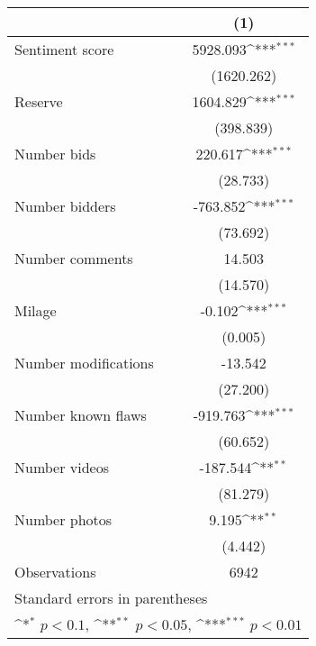 {
\def\sym#1{\ifmmode^{#1}\else\(^{#1}\)\fi}
\begin{tabular}{l*{1}{c}}
\hline\hline
                    &\multicolumn{1}{c}{(1)}         \\
\hline
Sentiment score     &    5928.093\sym{***}\\
                    &  (1620.262)         \\
[1em]
Reserve             &    1604.829\sym{***}\\
                    &   (398.839)         \\
[1em]
Number bids         &     220.617\sym{***}\\
                    &    (28.733)         \\
[1em]
Number bidders      &    -763.852\sym{***}\\
                    &    (73.692)         \\
[1em]
Number comments     &      14.503         \\
                    &    (14.570)         \\
[1em]
Milage              &      -0.102\sym{***}\\
                    &     (0.005)         \\
[1em]
Number modifications&     -13.542         \\
                    &    (27.200)         \\
[1em]
Number known flaws  &    -919.763\sym{***}\\
                    &    (60.652)         \\
[1em]
Number videos       &    -187.544\sym{**} \\
                    &    (81.279)         \\
[1em]
Number photos       &       9.195\sym{**} \\
                    &     (4.442)         \\
\hline
Observations        &        6942         \\
\hline\hline
\multicolumn{2}{l}{\footnotesize Standard errors in parentheses}\\
\multicolumn{2}{l}{\footnotesize \sym{*} \(p<0.1\), \sym{**} \(p<0.05\), \sym{***} \(p<0.01\)}\\
\end{tabular}
}
